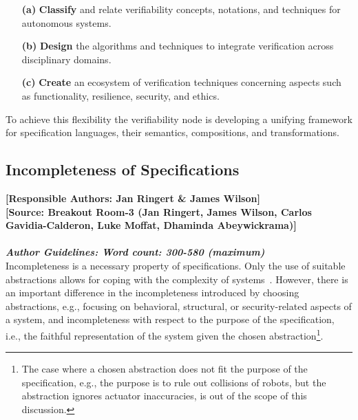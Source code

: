 \documentclass[sigconf]{acmart}
\begin{document}
\begin{enumerate}
  \item[\textbf{(a)}] \textbf{Classify} and relate verifiability concepts, notations, and techniques for autonomous systems.
  \item[\textbf{(b)}] \textbf{Design} the algorithms and techniques to integrate verification  across disciplinary domains.
  \item[\textbf{(c)}]  \textbf{Create} an ecosystem of verification techniques concerning aspects such as functionality, resilience, security, and ethics. 
\end{enumerate} 


To achieve this flexibility the verifiability node is developing a unifying framework for specification languages, their semantics, compositions, and transformations. 

\subsection{Incompleteness of Specifications}
\noindent\textbf{[Responsible Authors:  Jan Ringert \& James Wilson]}\\
\noindent \textbf{[Source: Breakout Room-3 (Jan Ringert, James Wilson, Carlos Gavidia-Calderon, Luke Moffat, Dhaminda Abeywickrama)]}\\\\
\noindent\textbf{\textit{Author Guidelines: Word count: 300-580 (maximum)}}\\

Incompleteness is a necessary property of specifications. Only the use of suitable abstractions allows for coping with the complexity of systems~\citep{Kramer07}. However, there is an important difference in the incompleteness introduced by choosing abstractions, e.g., focusing on behavioral, structural, or security-related aspects of a system, and incompleteness with respect to the purpose of the specification, i.e., the faithful representation of the system given the chosen abstraction\footnote{The case where a chosen abstraction does not fit the purpose of the specification, e.g., the purpose is to rule out collisions of robots, but the abstraction ignores actuator inaccuracies, is out of the scope of this discussion.}. 
\end{document}
